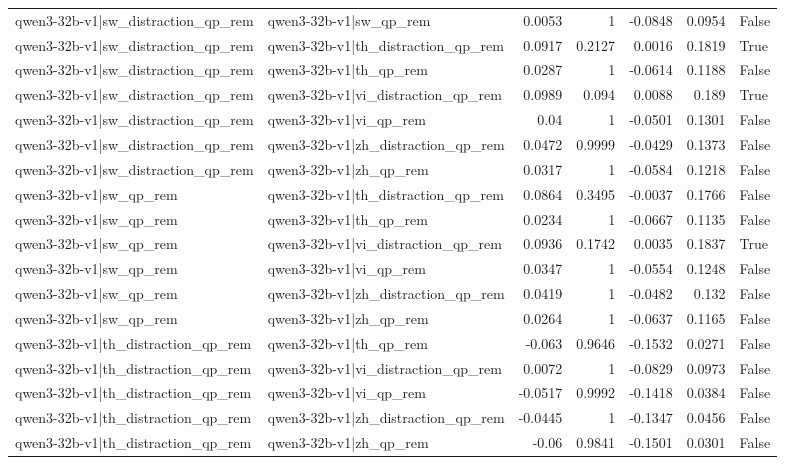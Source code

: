 \begin{table}
\begin{tabular}{l l r r r r l}
qwen3-32b-v1|sw_distraction_qp_rem & qwen3-32b-v1|sw_qp_rem & 0.0053 & 1 & -0.0848 & 0.0954 & False \\
qwen3-32b-v1|sw_distraction_qp_rem & qwen3-32b-v1|th_distraction_qp_rem & 0.0917 & 0.2127 & 0.0016 & 0.1819 & True \\
qwen3-32b-v1|sw_distraction_qp_rem & qwen3-32b-v1|th_qp_rem & 0.0287 & 1 & -0.0614 & 0.1188 & False \\
qwen3-32b-v1|sw_distraction_qp_rem & qwen3-32b-v1|vi_distraction_qp_rem & 0.0989 & 0.094 & 0.0088 & 0.189 & True \\
qwen3-32b-v1|sw_distraction_qp_rem & qwen3-32b-v1|vi_qp_rem & 0.04 & 1 & -0.0501 & 0.1301 & False \\
qwen3-32b-v1|sw_distraction_qp_rem & qwen3-32b-v1|zh_distraction_qp_rem & 0.0472 & 0.9999 & -0.0429 & 0.1373 & False \\
qwen3-32b-v1|sw_distraction_qp_rem & qwen3-32b-v1|zh_qp_rem & 0.0317 & 1 & -0.0584 & 0.1218 & False \\
qwen3-32b-v1|sw_qp_rem & qwen3-32b-v1|th_distraction_qp_rem & 0.0864 & 0.3495 & -0.0037 & 0.1766 & False \\
qwen3-32b-v1|sw_qp_rem & qwen3-32b-v1|th_qp_rem & 0.0234 & 1 & -0.0667 & 0.1135 & False \\
qwen3-32b-v1|sw_qp_rem & qwen3-32b-v1|vi_distraction_qp_rem & 0.0936 & 0.1742 & 0.0035 & 0.1837 & True \\
qwen3-32b-v1|sw_qp_rem & qwen3-32b-v1|vi_qp_rem & 0.0347 & 1 & -0.0554 & 0.1248 & False \\
qwen3-32b-v1|sw_qp_rem & qwen3-32b-v1|zh_distraction_qp_rem & 0.0419 & 1 & -0.0482 & 0.132 & False \\
qwen3-32b-v1|sw_qp_rem & qwen3-32b-v1|zh_qp_rem & 0.0264 & 1 & -0.0637 & 0.1165 & False \\
qwen3-32b-v1|th_distraction_qp_rem & qwen3-32b-v1|th_qp_rem & -0.063 & 0.9646 & -0.1532 & 0.0271 & False \\
qwen3-32b-v1|th_distraction_qp_rem & qwen3-32b-v1|vi_distraction_qp_rem & 0.0072 & 1 & -0.0829 & 0.0973 & False \\
qwen3-32b-v1|th_distraction_qp_rem & qwen3-32b-v1|vi_qp_rem & -0.0517 & 0.9992 & -0.1418 & 0.0384 & False \\
qwen3-32b-v1|th_distraction_qp_rem & qwen3-32b-v1|zh_distraction_qp_rem & -0.0445 & 1 & -0.1347 & 0.0456 & False \\
qwen3-32b-v1|th_distraction_qp_rem & qwen3-32b-v1|zh_qp_rem & -0.06 & 0.9841 & -0.1501 & 0.0301 & False \\

\end{tabular}
\end{table}

